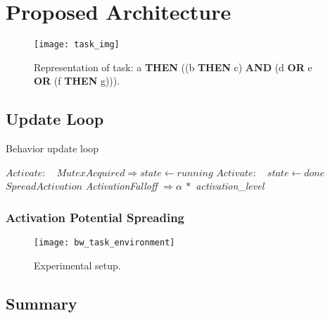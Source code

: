 \chapter{Proposed Architecture}
\label{architecture}
\blindtext[3]


\begin{figure}
\centering
  \texttt{[image: task\_img]}
\caption{Representation of task: a {\bf THEN} ((b {\bf THEN} c) {\bf AND} (d {\bf OR} e {\bf OR} (f {\bf THEN} g))).}
\label{fig:task_representation}
\end{figure}

\blindtext[3]

\section{Update Loop}
\label{sec:updateloop}
\begin{algorithm}
\caption{Behavior update loop}
\label{alg:update}
\begin{algorithmic}[1]
      \STATE $Activate:$
        \STATE $~~~Mutex Acquired \Rightarrow state \leftarrow running$
        \STATE $Activate:$
          \STATE $~~~state \leftarrow done$
      \ENDIF
    \ELSE
      \STATE $SpreadActivation$
    \ENDIF
    \STATE \emph{ActivationFalloff} $\Rightarrow \alpha ~*$ \emph{activation\_level}  
  \ENDIF
\ENDIF
\end{algorithmic}
\label{update-loop}
\end{algorithm}

\subsection{Activation Potential Spreading}
\blindtext
\begin{figure}
\centering
  \texttt{[image: bw\_task\_environment]}
\caption{Experimental setup.}
\label{fig:setup}       %
\end{figure}

\section{Summary}
\blindtext